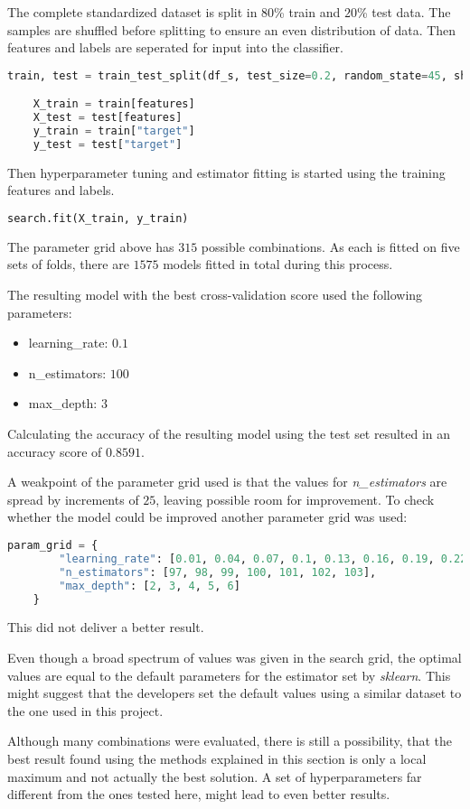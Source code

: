 The complete standardized dataset is split in $80$\% train and $20$\% test data.
The samples are shuffled before splitting to ensure an even distribution of data.
Then features and labels are seperated for input into the classifier.

\begin{lstlisting}[language=Python]
    train, test = train_test_split(df_s, test_size=0.2, random_state=45, shuffle=True)

    X_train = train[features]
    X_test = test[features]
    y_train = train["target"]
    y_test = test["target"]
\end{lstlisting}

Then hyperparameter tuning and estimator fitting is started using the training features and labels.

\begin{lstlisting}[language=Python]
    search.fit(X_train, y_train)
\end{lstlisting}

The parameter grid above has $315$ possible combinations. As each is fitted on five sets of folds,
there are $1575$ models fitted in total during this process.

The resulting model with the best cross-validation score used the following parameters:
\begin{itemize}
    \item learning\_rate: $0.1$
    \item n\_estimators: $100$
    \item max\_depth: $3$
\end{itemize} 

Calculating the accuracy of the resulting model using the test set resulted in an accuracy score of $0.8591$.

A weakpoint of the parameter grid used is that the values for \emph{n\_estimators} are spread by increments of $25$,
leaving possible room for improvement.
To check whether the model could be improved another parameter grid was used:

\begin{lstlisting}[language=Python]
    param_grid = {
        "learning_rate": [0.01, 0.04, 0.07, 0.1, 0.13, 0.16, 0.19, 0.22, 0.25],
        "n_estimators": [97, 98, 99, 100, 101, 102, 103],
        "max_depth": [2, 3, 4, 5, 6]
    }
\end{lstlisting}

This did not deliver a better result.

Even though a broad spectrum of values was given in the search grid, the optimal values 
are equal to the default parameters for the estimator set by \emph{sklearn}.
This might suggest that the developers set the default values using a similar dataset to the one used in this project.

Although many combinations were evaluated, there is still a possibility, that the best result found using the methods
explained in this section is only a local maximum and not actually the best solution.
A set of hyperparameters far different from the ones tested here, might lead to even better results.